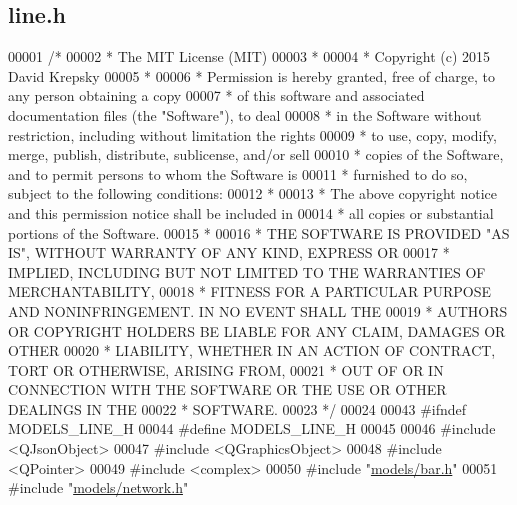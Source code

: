 \hypertarget{line_8h_source}{}\subsection{line.\+h}
\label{line_8h_source}

\begin{DoxyCode}
00001 \textcolor{comment}{/*}
00002 \textcolor{comment}{ * The MIT License (MIT)}
00003 \textcolor{comment}{ *}
00004 \textcolor{comment}{ * Copyright (c) 2015 David Krepsky}
00005 \textcolor{comment}{ *}
00006 \textcolor{comment}{ * Permission is hereby granted, free of charge, to any person obtaining a copy}
00007 \textcolor{comment}{ * of this software and associated documentation files (the "Software"), to deal}
00008 \textcolor{comment}{ * in the Software without restriction, including without limitation the rights}
00009 \textcolor{comment}{ * to use, copy, modify, merge, publish, distribute, sublicense, and/or sell}
00010 \textcolor{comment}{ * copies of the Software, and to permit persons to whom the Software is}
00011 \textcolor{comment}{ * furnished to do so, subject to the following conditions:}
00012 \textcolor{comment}{ *}
00013 \textcolor{comment}{ * The above copyright notice and this permission notice shall be included in}
00014 \textcolor{comment}{ * all copies or substantial portions of the Software.}
00015 \textcolor{comment}{ *}
00016 \textcolor{comment}{ * THE SOFTWARE IS PROVIDED "AS IS", WITHOUT WARRANTY OF ANY KIND, EXPRESS OR}
00017 \textcolor{comment}{ * IMPLIED, INCLUDING BUT NOT LIMITED TO THE WARRANTIES OF MERCHANTABILITY,}
00018 \textcolor{comment}{ * FITNESS FOR A PARTICULAR PURPOSE AND NONINFRINGEMENT. IN NO EVENT SHALL THE}
00019 \textcolor{comment}{ * AUTHORS OR COPYRIGHT HOLDERS BE LIABLE FOR ANY CLAIM, DAMAGES OR OTHER}
00020 \textcolor{comment}{ * LIABILITY, WHETHER IN AN ACTION OF CONTRACT, TORT OR OTHERWISE, ARISING FROM,}
00021 \textcolor{comment}{ * OUT OF OR IN CONNECTION WITH THE SOFTWARE OR THE USE OR OTHER DEALINGS IN THE}
00022 \textcolor{comment}{ * SOFTWARE.}
00023 \textcolor{comment}{ */}
00024 
00043 \textcolor{preprocessor}{#ifndef MODELS\_LINE\_H}
00044 \textcolor{preprocessor}{#define MODELS\_LINE\_H}
00045 
00046 \textcolor{preprocessor}{#include <QJsonObject>}
00047 \textcolor{preprocessor}{#include <QGraphicsObject>}
00048 \textcolor{preprocessor}{#include <QPointer>}
00049 \textcolor{preprocessor}{#include <complex>}
00050 \textcolor{preprocessor}{#include "\hyperlink{bar_8h}{models/bar.h}"}
00051 \textcolor{preprocessor}{#include "\hyperlink{network_8h}{models/network.h}"}

\end{DoxyCode}
